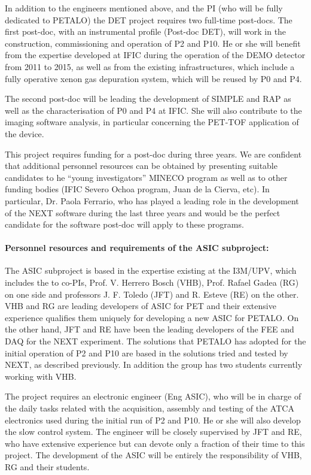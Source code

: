 In addition to the engineers mentioned above, and the PI (who will be fully dedicated to PETALO) the DET project requires two full-time post-docs. The first post-doc, with an instrumental profile (Post-doc DET), will work in the construction, commissioning and operation of P2 and P10. He or she will benefit from the expertise developed at IFIC during the operation of the DEMO detector from 2011 to 2015, as well as from the existing infrastructures, which include a fully operative xenon gas depuration system, which will be reused by P0 and P4. 

 The second post-doc will be leading the development of SIMPLE and RAP as well as the characterisation of P0 and P4 at IFIC. She will also contribute to the imaging software analysis, in particular concerning the PET-TOF application of the device.
 
This project requires funding for a post-doc during three years. We are confident that additional personnel resources can be obtained by presenting suitable candidates to he ``young investigators'' MINECO program as well as to other funding bodies (IFIC Severo Ochoa program, Juan de la Cierva, etc). In particular,  
Dr. Paola Ferrario, who has played a leading role in the development of the NEXT software during the last three years and would be the perfect candidate for the software post-doc will apply to these programs. 
 
 \paragraph{Personnel resources and requirements of the ASIC subproject:} 

The ASIC subproject is based in the expertise existing  at the I3M/UPV, which includes the to co-PIs, Prof. V. Herrero Bosch (VHB), Prof. Rafael Gadea (RG) on one side and professors J. F. Toledo (JFT) and R. Esteve (RE) on the other. VHB and RG are leading developers of ASIC for PET and their extensive experience qualifies them uniquely for developing a new ASIC for PETALO. On the other hand, JFT and RE have been the leading developers of the FEE and DAQ for the NEXT experiment. The solutions that PETALO has adopted for the initial operation of P2 and P10 are based in the solutions tried and tested by NEXT, as described previously. 
In addition the group has two students currently working with VHB.

The project requires an electronic engineer (Eng ASIC), who will be in charge of the daily tasks related with the acquisition, assembly and testing of the ATCA electronics used during the initial run of P2 and P10.  He or she will also develop the slow control system. The engineer will be closely supervised by JFT and RE, who have extensive experience but can devote only a fraction of their time to this project. The development of the ASIC will be entirely the responsibility of VHB, RG and their students. 

